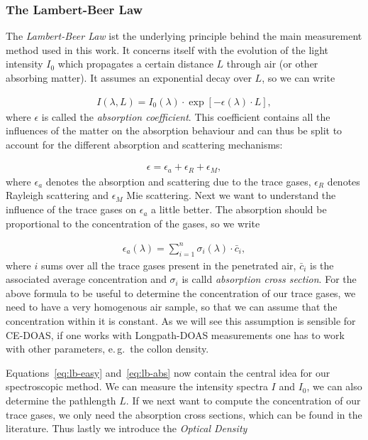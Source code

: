 \subsubsection{The Lambert-Beer Law}
\label{sec:lambert-beer}

The \emph{Lambert-Beer Law} ist the underlying principle behind the
main measurement method used in this work. It concerns itself with the
evolution of the light intensity $I_0$ which propagates a certain
distance $L$ through air (or other absorbing matter). It assumes an
exponential decay over $L$, so we can write

\begin{align}
  I(\lambda, L) = I_0(\lambda) \cdot \exp[-\epsilon(\lambda) \cdot
  L], \label{eq:lb-easy}
\end{align}
where $\epsilon$ is called the \emph{absorption coefficient}. This
coefficient contains all the influences of the matter on the
absorption behaviour and can thus be split to account for the different
absorption and scattering mechanisms:

\begin{align*}
  \epsilon = \epsilon_a + \epsilon_R + \epsilon_M,
\end{align*}
where $\epsilon_a$ denotes the absorption and scattering due to the
trace gases, $\epsilon_R$ denotes Rayleigh scattering and $\epsilon_M$
Mie scattering. Next we want to understand the influence of the trace
gases on $\epsilon_a$ a little better. The absorption should be
proportional to the concentration of the gases, so we write

\begin{align}
  \epsilon_a(\lambda) = \sum_{i=1}^n \sigma_i(\lambda) \cdot \bar c_i, \label{eq:lb-abs}
\end{align}
where $i$ sums over all the trace gases present in the penetrated
air, $\bar c_i$ is the associated average concentration and $\sigma_i$
is calld \emph{absorption cross section}. For the above formula to be
useful to determine the concentration of our trace gases, we need to
have a very homogenous air sample, so that we can assume that the
concentration within it is constant. As we will see this assumption is
sensible for CE-DOAS, if one works with Longpath-DOAS measurements one
has to work with other parameters, e.\,g.\ the collon density.

Equations~\eqref{eq:lb-easy} and~\eqref{eq:lb-abs} now contain the central idea for our
spectroscopic method. We can measure the intensity spectra $I$ and
$I_0$, we can also determine the pathlength $L$. If we next want to
compute the concentration of our trace gases, we only need the
absorption cross sections, which can be found in the
literature. Thus lastly we introduce the \emph{Optical
  Density} 

